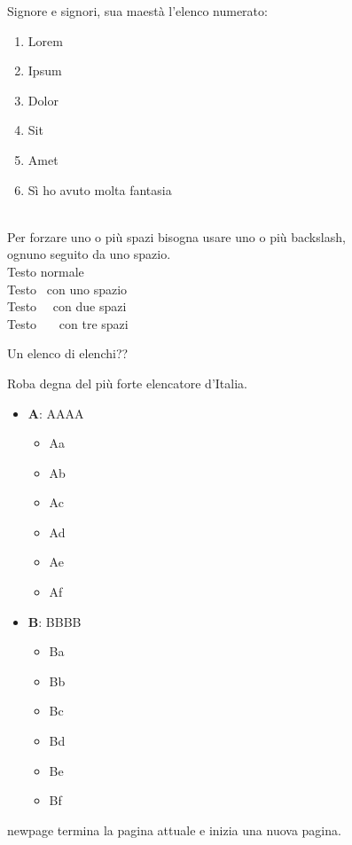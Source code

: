 \documentclass[envcountsame,envcountchap]{svmono}
\begin{document}
\begin{figure}
Signore e signori, sua maestà l'elenco numerato:
\begin{enumerate}
    \item Lorem
    \item Ipsum
    \item Dolor
    \item Sit
    \item Amet
    \item Sì ho avuto molta fantasia
\end{enumerate} 

\ \\

Per forzare uno o più spazi bisogna usare uno o più backslash, ognuno seguito da uno spazio.\\
Testo normale\\
Testo \ con uno spazio\\
Testo \ \ con due spazi\\
Testo \ \ \ con tre spazi

Un elenco di elenchi??

Roba degna del più forte elencatore d'Italia. \citep{elencatoreSeriale}
\begin{itemize}
    \item \textbf{A}: AAAA
    \begin{itemize}
        \item Aa
        \item Ab
        \item Ac
        \item Ad
        \item Ae
        \item Af
    \end{itemize} 
    \item \textbf{B}: BBBB
    \begin{itemize}
        \item Ba
        \item Bb
        \item Bc
        \item Bd
        \item Be
        \item Bf
    \end{itemize}
\end{itemize}

\newpage
newpage termina la pagina attuale e inizia una nuova pagina.

\vspace*{2cm}


\end{figure}
\end{document}
